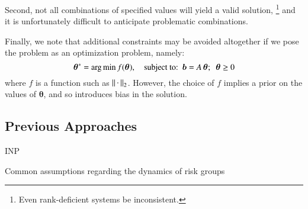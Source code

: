 Second, not all combinations of specified values will yield a valid solution,%
\footnote{Even rank-deficient systems be inconsistent.}
and it is unfortunately difficult to anticipate problematic combinations.
\par
Finally, we note that additional constraints may be avoided altogether if we pose the problem
as an optimization problem, namely:
\begin{equation}\label{eq:system-optimize}
\bm{\theta}^{*} = {\arg \min}
\thinspace f(\bm{\theta}),
\quad \textrm{subject to:}
\enspace\bm{b} = A\thinspace\bm{\theta};
\enspace\bm{\theta} \ge 0
\end{equation}
where $f$ is a function such as ${\left|\left| \thinspace\cdot\thinspace \right|\right|}_2$.
However, the choice of $f$ implies a prior on the values of $\bm{\theta}$,
and so introduces bias in the solution.
\subsection{Previous Approaches}
INP
\begin{floatbox}
  \caption{Common assumptions regarding the dynamics of risk groups}
  \label{box:assumptions}
  
\end{floatbox}

